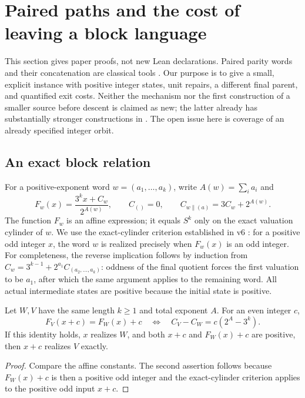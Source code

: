 \section{Paired paths and the cost of leaving a block language}
\label{sec:paired-paths}

This section gives paper proofs, not new Lean declarations. Paired parity
words and their concatenation are classical tools
\cite{garner1985,eliatucker2015}. Our purpose is to give a small, explicit
instance with positive integer states, unit repairs, a different final
parent, and quantified exit costs. Neither the mechanism nor the first
construction of a smaller source before descent is claimed as new;
the latter already has substantially stronger constructions in
\cite[Theorem~3]{weaver21}. The open issue here is coverage of an already
specified integer orbit.

\subsection{An exact block relation}

For a positive-exponent word $w=(a_1,\ldots,a_k)$, write
$A(w)=\sum_i a_i$ and
\[
 F_w(x)=\frac{3^k x+C_w}{2^{A(w)}},\qquad
 C_{()}=0,\qquad C_{w\mathbin{\|}(a)}=3C_w+2^{A(w)}.
\]
The function $F_w$ is an affine expression; it equals $S^k$ only on the
exact valuation cylinder of $w$. We use the exact-cylinder criterion
established in v6 \cite{borgatta_v6}: for a positive odd integer $x$,
the word $w$ is realized precisely when $F_w(x)$ is an odd integer.
For completeness, the reverse implication follows by induction from
$C_w=3^{k-1}+2^{a_1}C_{(a_2,\ldots,a_k)}$: oddness of the final quotient
forces the first valuation to be $a_1$, after which the same argument
applies to the remaining word. All actual intermediate states are
positive because the initial state is positive.

\begin{lemma}\label{pp:translation}
Let $W,V$ have the same length $k\ge1$ and total exponent $A$.
For an even integer $c$,
\[
 F_V(x+c)=F_W(x)+c
 \quad\Longleftrightarrow\quad
 C_V-C_W=c(2^A-3^k).
\]
If this identity holds, $x$ realizes $W$, and both $x+c$ and
$F_W(x)+c$ are positive, then $x+c$ realizes $V$ exactly.
\end{lemma}
\begin{proof}
Compare the affine constants. The second assertion follows because
$F_W(x)+c$ is then a positive odd integer and the exact-cylinder
criterion applies to the positive odd input $x+c$.
\end{proof}

